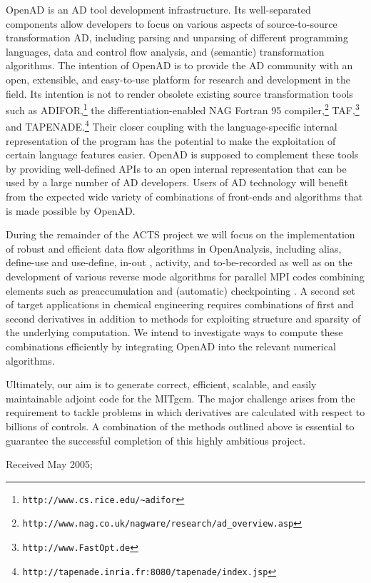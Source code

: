 \documentclass[acmtocl,acmnow]{acmtrans2m}
\begin{document}
OpenAD is an AD tool development infrastructure. Its well-separated components
allow developers to focus on various aspects of source-to-source 
transformation AD, including parsing and unparsing of different programming
languages, data and control flow analysis, and (semantic) transformation 
algorithms. The intention of OpenAD is to provide the AD community with 
an open, extensible, and easy-to-use platform for research and development
in the field. Its intention is not to render obsolete existing source transformation
tools such as ADIFOR,\footnote{{\tt http://www.cs.rice.edu/\~\!adifor}} 
the differentiation-enabled NAG Fortran 95 
compiler,\footnote{{\tt http://www.nag.co.uk/nagware/research/ad\_overview.asp}} TAF,\footnote{{\tt http://www.FastOpt.de}} and TAPENADE.\footnote{{\tt http://tapenade.inria.fr:8080/tapenade/index.jsp}} 
Their closer coupling with the language-specific internal representation of 
the program has the potential to make the
exploitation of certain language features easier. OpenAD is supposed to 
complement these tools by providing well-defined APIs to an open internal 
representation that can be used by a large number of AD developers.
Users of AD technology will benefit from the expected wide
variety of combinations of front-ends and algorithms that is made possible
by OpenAD.

During the remainder of the ACTS project we will focus on the implementation
of robust and efficient data flow algorithms in OpenAnalysis, including alias, 
define-use and use-define, in-out \cite{Muc97}, 
activity, and to-be-recorded \cite{HNP02} as well as on 
the development of various reverse mode algorithms for parallel MPI codes
combining elements such as preaccumulation and (automatic) checkpointing
\cite{Gri92}. 
A second set of target 
applications in chemical engineering \cite{FTB97} requires combinations of first and 
second derivatives in addition to methods for exploiting structure and sparsity
of the underlying computation. We intend to investigate ways to compute these
combinations efficiently by integrating OpenAD into the relevant 
numerical algorithms.

Ultimately, our aim is to generate correct, efficient, scalable, and easily 
maintainable adjoint code for the MITgcm. The major challenge arises from the
requirement to tackle problems in which derivatives are calculated with respect 
to billions of controls. A combination of the methods outlined above is 
essential to guarantee the successful completion of this highly ambitious
project.






\begin{received}
Received May 2005;
\end{received}
\end{document}
